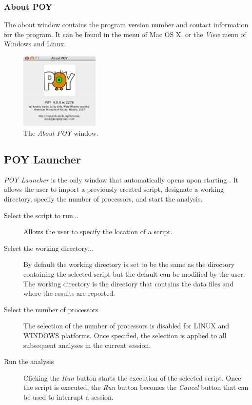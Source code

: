 \subsubsection{About POY}

The about window contains the program version number and contact information for
the program. It can be found in the \poy menu of Mac OS X, or the \emph{View} menu of
Windows and Linux.
\begin{figure}[htpb]
    \begin{center}
        \includegraphics[width=0.35\textwidth]{figures/About_Window.jpg}
    \end{center}
    \caption{The \emph{About POY} window.}
    \label{fig:about_window}
\end{figure}

\subsection{POY Launcher} 
\emph{POY Launcher} is the only window that automatically opens upon starting
\poy. It allows the user to import a previously created script,
designate a working directory, specify the number of processors,
and start the analysis.

\begin{description}
	\item[Select the script to run...]
     Allows the user to specify the location of a \poy script.
	\item[Select the working directory...]
    By default the working directory is set to be the same as the
    directory containing the selected \poy script but the default
    can be modified by the user. The working directory is the
    directory that contains the data files and where the results
    are reported.
	\item[Select the number of processors]
    The selection of the number of processors is disabled for LINUX
    and WINDOWS platforms. Once specified, the selection is applied
    to all subsequent analyses in the current \poy session.
	\item[Run the analysis]
    Clicking the \emph{Run} button starts the execution of the selected
    script. Once the script is executed, the \emph{Run} button
    becomes the \emph{Cancel} button that can be used to interrupt
    a \poy session.
\end{description}

